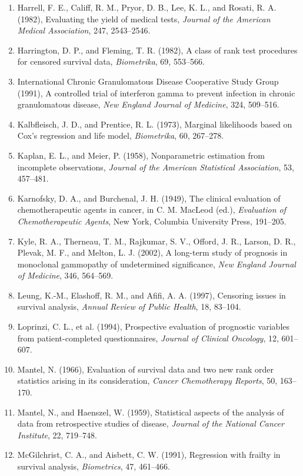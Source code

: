 \documentclass[11pt,a4paper]{article}
\numberwithin{equation}{section}
\theoremstyle{definition}
\begin{document}
\begin{enumerate}
\item Harrell, F. E., Califf, R. M., Pryor, D. B., Lee, K. L., and Rosati, R. A. (1982), Evaluating the yield of medical tests, \emph{Journal of the American Medical Association}, 247, 2543--2546.
\item Harrington, D. P., and Fleming, T. R. (1982), A class of rank test procedures for censored survival data, \emph{Biometrika}, 69, 553--566.
\item International Chronic Granulomatous Disease Cooperative Study Group (1991), A controlled trial of interferon gamma to prevent infection in chronic granulomatous disease, \emph{New England Journal of Medicine}, 324, 509--516.
\item Kalbfleisch, J. D., and Prentice, R. L. (1973), Marginal likelihoods based on Cox's regression and life model, \emph{Biometrika}, 60, 267--278.
\item Kaplan, E. L., and Meier, P. (1958), Nonparametric estimation from incomplete observations, \emph{Journal of the American Statistical Association}, 53, 457--481.
\item Karnofsky, D. A., and Burchenal, J. H. (1949), The clinical evaluation of chemotherapeutic agents in cancer, in C. M. MacLeod (ed.), \emph{Evaluation of Chemotherapeutic Agents}, New York, Columbia University Press, 191--205.
\item Kyle, R. A., Therneau, T. M., Rajkumar, S. V., Offord, J. R., Larson, D. R., Plevak, M. F., and Melton, L. J. (2002), A long-term study of prognosis in monoclonal gammopathy of undetermined significance, \emph{New England Journal of Medicine}, 346, 564--569.
\item Leung, K.-M., Elashoff, R. M., and Afifi, A. A. (1997), Censoring issues in survival analysis, \emph{Annual Review of Public Health}, 18, 83--104.
\item Loprinzi, C. L., et al. (1994), Prospective evaluation of prognostic variables from patient-completed questionnaires, \emph{Journal of Clinical Oncology}, 12, 601--607.
\item Mantel, N. (1966), Evaluation of survival data and two new rank order statistics arising in its consideration, \emph{Cancer Chemotherapy Reports}, 50, 163--170.
\item Mantel, N., and Haenszel, W. (1959), Statistical aspects of the analysis of data from retrospective studies of disease, \emph{Journal of the National Cancer Institute}, 22, 719--748.
\item McGilchrist, C. A., and Aisbett, C. W. (1991), Regression with frailty in survival analysis, \emph{Biometrics}, 47, 461--466.

\end{enumerate}
\end{document}
